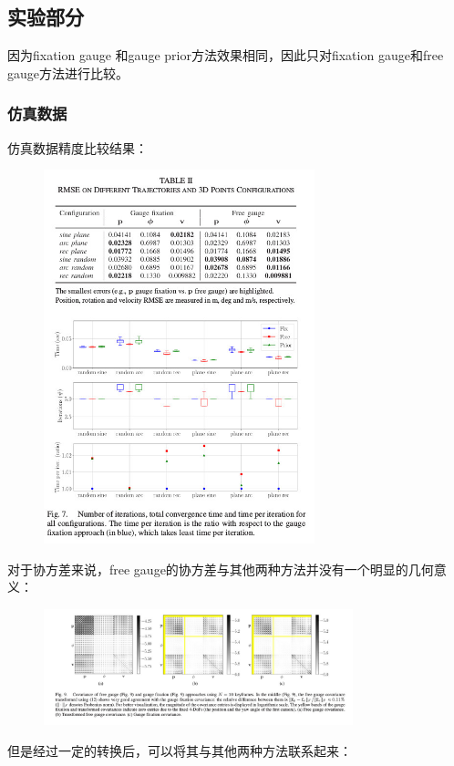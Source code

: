 \documentclass[UTF8]{ctexart}
\begin{document}
\subsection{实验部分}
\indent 因为fixation gauge 和gauge prior方法效果相同，因此只对fixation gauge和free gauge方法进行比较。
\subsubsection{仿真数据}
\indent 仿真数据精度比较结果：
\begin{figure}[H]
\centering
\includegraphics[width=0.7\textwidth]{2.2.jpg}    
\label{img0}
\end{figure}
\indent 对于协方差来说，free gauge的协方差与其他两种方法并没有一个明显的几何意义：
\begin{figure}[H]
\centering
\includegraphics[width=0.8\textwidth]{2.3.jpg}    
\label{img0}
\end{figure}
\indent 但是经过一定的转换后，可以将其与其他两种方法联系起来：
\end{document}
